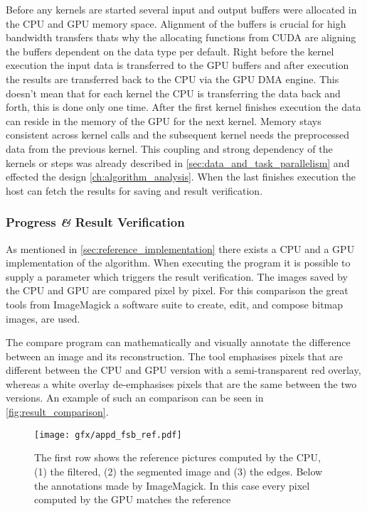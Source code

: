 Before any kernels are started several input and output buffers were allocated
in the \gls{CPU} and \gls{GPU} memory space. Alignment of the buffers is
crucial for high bandwidth transfers thats why the allocating functions from
\gls{CUDA} are aligning the buffers dependent on the data type per default.
Right before the kernel execution the input data is transferred to the \gls{GPU}
buffers and after execution the results are transferred back to the \gls{CPU}
via the \gls{GPU} \gls{DMA} engine. This doesn't mean that for each kernel the
\gls{CPU} is transferring the data back and forth, this is done only one time.
After the first kernel finishes execution the data can reside in the memory of
the \gls{GPU} for the next kernel. Memory stays consistent across kernel calls
and the subsequent kernel needs the preprocessed data from the previous kernel.
This coupling and strong dependency of the kernels or steps was already
described in \autoref{sec:data_and_task_parallelism} and effected the design
\autoref{ch:algorithm_analysis}. When the last finishes execution the
host can fetch the results for saving and result verification. 

\subsubsection{Progress \textit{\&} Result Verification} %
\label{ssub:progress_result_verification}
As mentioned in \autoref{sec:reference_implementation} there exists a \gls{CPU}
and a \gls{GPU} implementation of the algorithm. When executing the program
it is possible to supply a parameter which triggers the result verification. The
images saved by the \gls{CPU} and \gls{GPU} are compared pixel by pixel. For 
this comparison the great tools from ImageMagick a software suite to 
create, edit, and compose bitmap images, are used. 

The compare program can mathematically and visually annotate the difference 
between an image and its reconstruction. The tool emphasises pixels that are 
different between the \gls{CPU} and \gls{GPU} version with a semi-transparent red
overlay, whereas a white overlay de-emphasises pixels that are the same between
the two versions. An example of such an comparison can be seen in 
\autoref{fig:result_comparison}.

\begin{figure}[ht]
  \centering
 	\texttt{[image: gfx/appd\_fsb\_ref.pdf]}
  \caption{The first row shows the reference pictures
	computed by the \protect\gls{CPU}, (1) the filtered, (2) the segmented image 
	and (3) the edges. Below the annotations made by ImageMagick. In this case
	every pixel computed by the \protect\gls{GPU} matches the reference}
  \label{fig:result_comparison}
\end{figure}

